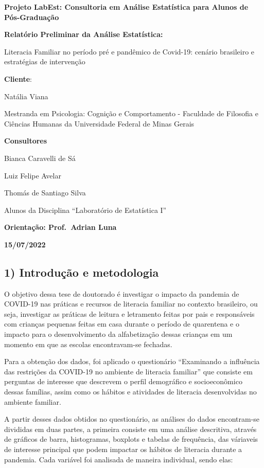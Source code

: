 \documentclass[
]{article}
\author{}
\date{\vspace{-2.5em}}
\begin{document}
\textbf{Projeto LabEst: Consultoria em Análise Estatística para Alunos
de Pós-Graduação}

\textbf{Relatório Preliminar da Análise Estatística:}

Literacia Familiar no período pré e pandêmico de Covid-19: cenário
brasileiro e estratégias de intervenção

\textbf{Cliente}:

Natália Viana

Mestranda em Psicologia: Cognição e Comportamento - Faculdade de
Filosofia e Ciências Humanas da Universidade Federal de Minas Gerais

\textbf{Consultores}

Bianca Caravelli de Sá

Luiz Felipe Avelar

Thomás de Santiago Silva

Alunos da Disciplina ``Laboratório de Estatística I''

\textbf{Orientação: Prof.~Adrian Luna}

\textbf{15/07/2022}

\hypertarget{introduuxe7uxe3o-e-metodologia}{%
\subsection{\texorpdfstring{1) \textbf{Introdução e
metodologia}}{1) Introdução e metodologia}}\label{introduuxe7uxe3o-e-metodologia}}

O objetivo dessa tese de doutorado é investigar o impacto da pandemia de
COVID-19 nas práticas e recursos de literacia familiar no contexto
brasileiro, ou seja, investigar as práticas de leitura e letramento
feitas por pais e responsáveis com crianças pequenas feitas em casa
durante o período de quarentena e o impacto para o desenvolvimento da
alfabetização dessas crianças em um momento em que as escolas
encontravam-se fechadas.

Para a obtenção dos dados, foi aplicado o questionário ``Examinando a
influência das restrições da COVID-19 no ambiente de literacia
familiar'' que consiste em perguntas de interesse que descrevem o perfil
demográfico e socioeconômico dessas famílias, assim como os hábitos e
atividades de literacia desenvolvidas no ambiente familiar.

A partir desses dados obtidos no questionário, as análises do dados
encontram-se divididas em duas partes, a primeira consiste em uma
análise descritiva, através de gráficos de barra, histogramas, boxplots
e tabelas de frequência, das váriaveis de interesse principal que podem
impactar os hábitos de literacia durante a pandemia. Cada variável foi
analisada de maneira individual, sendo elas:
\end{document}
